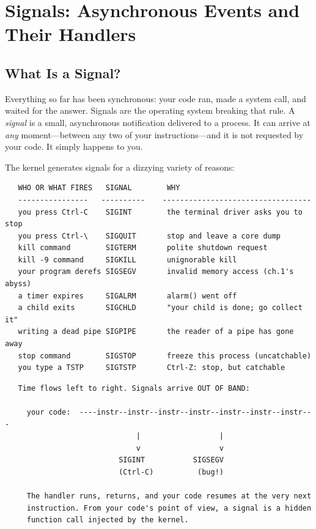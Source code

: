 
\chapter{Signals: Asynchronous Events and Their Handlers}

\section{What Is a Signal?}

Everything so far has been synchronous: your code ran, made a system
call, and waited for the answer. Signals are the operating system
breaking that rule. A \emph{signal} is a small, asynchronous
notification delivered to a process. It can arrive at \emph{any}
moment---between any two of your instructions---and it is not requested
by your code. It simply happens to you.

The kernel generates signals for a dizzying variety of reasons:

\begin{verbatim}
   WHO OR WHAT FIRES   SIGNAL        WHY
   ----------------   ----------    ----------------------------------
   you press Ctrl-C    SIGINT        the terminal driver asks you to stop
   you press Ctrl-\    SIGQUIT       stop and leave a core dump
   kill command        SIGTERM       polite shutdown request
   kill -9 command     SIGKILL       unignorable kill
   your program derefs SIGSEGV       invalid memory access (ch.1's abyss)
   a timer expires     SIGALRM       alarm() went off
   a child exits       SIGCHLD       "your child is done; go collect it"
   writing a dead pipe SIGPIPE       the reader of a pipe has gone away
   stop command        SIGSTOP       freeze this process (uncatchable)
   you type a TSTP     SIGTSTP       Ctrl-Z: stop, but catchable
\end{verbatim}

\begin{verbatim}
   Time flows left to right. Signals arrive OUT OF BAND:

     your code:  ----instr--instr--instr--instr--instr--instr--instr---
                              |                  |
                              v                  v
                          SIGINT           SIGSEGV
                          (Ctrl-C)          (bug!)

     The handler runs, returns, and your code resumes at the very next
     instruction. From your code's point of view, a signal is a hidden
     function call injected by the kernel.
\end{verbatim}

